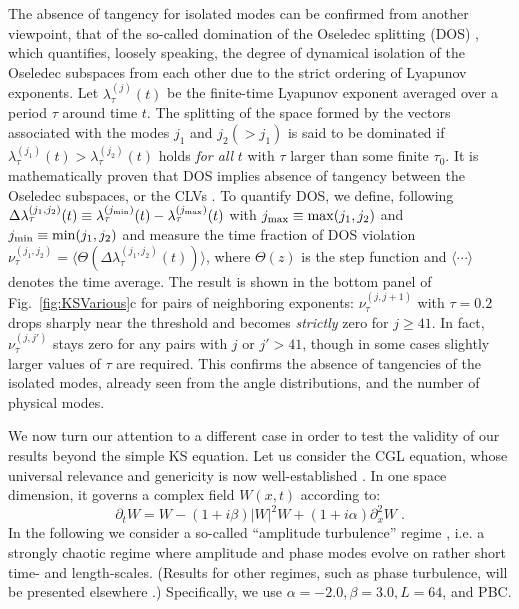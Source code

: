 \documentclass[prl,twocolumn,twoside,showpacs,superscriptaddress]{revtex4}
\newcommand{\p}{\partial}
\begin{document}
The absence of tangency for isolated modes can be confirmed
 from another viewpoint, that of the so-called
 domination of the Oseledec splitting (DOS) \cite{DOS},
 which quantifies, loosely speaking, the degree of dynamical isolation
 of the Oseledec subspaces from each other due to the strict ordering
 of Lyapunov exponents.
Let $\lambda_\tau^{(j)}(t)$ be the finite-time Lyapunov exponent
 averaged over a period $\tau$ around time $t$.
The splitting of the space formed by the vectors
 associated with the modes $j_1$ and $j_2 (> j_1)$
 is said to be dominated
 if $\lambda_\tau^{(j_1)}(t) > \lambda_\tau^{(j_2)}(t)$ holds
 \textit{for all} $t$ with $\tau$ larger than some finite $\tau_0$.
It is mathematically proven that DOS implies absence of tangency
 between the Oseledec subspaces, or the CLVs \cite{DOS}.
To quantify DOS, we define, following \cite{Yang_Radons-PRL2008}
$
\Delta\lambda_\tau^{(j_1,j_2)}(t) \equiv \lambda_\tau^{(j_{\rm min})}(t) 
- \lambda_\tau^{(j_{\rm max})}(t)$
with $j_{\rm max} \equiv \max (j_1,j_2)$ and $j_{\rm min} \equiv \min (j_1,j_2)$
and measure the time fraction of DOS violation
$\nu^{(j_1,j_2)}_\tau = \langle \Theta( \Delta\lambda_\tau^{(j_1,j_2)}(t) ) \rangle$,
 where $\Theta(z)$ is the step function
 and $\langle\cdots\rangle$ denotes the time average.
The result is shown in the bottom panel of Fig.\ \ref{fig:KSVarious}c for pairs of
neighboring exponents:
$\nu^{(j,j+1)}_\tau$ with $\tau = 0.2$ drops sharply near the threshold
 and becomes \textit{strictly} zero for $j \geq 41$.
In fact, $\nu^{(j,j')}_\tau$ stays zero for any pairs with $j$ or $j' > 41$,
 though in some cases slightly larger values of $\tau$ are required.
This confirms the absence of tangencies of the isolated modes,
already seen from the angle distributions, and the number of physical
modes.

We now turn our attention to a different case in order to test the 
validity of our results beyond the simple KS equation.
Let us consider the CGL equation, whose universal relevance and genericity 
is now well-established
 \cite{Cross_Hohenberg-RMP1993,Aranson_Kramer-RMP2002}. In one space dimension,
it governs a complex field $W(x,t)$ according to:
\begin{equation}
 \p_tW = W - (1+i \beta)|W|^2W + (1+i \alpha)\p_x^2 W \;.
\label{eq:CGL}
\end{equation}
In the following 
we consider a so-called ``amplitude turbulence'' regime
 \cite{Shraiman_etal-PhysD1992}, 
i.e. a strongly chaotic
regime where amplitude and phase modes evolve on rather short time- and 
length-scales. (Results for other regimes, such as phase turbulence, 
will be presented elsewhere \cite{TBP}.)
Specifically, we use $\alpha = -2.0, \beta = 3.0, L = 64$, and PBC.
\end{document}
